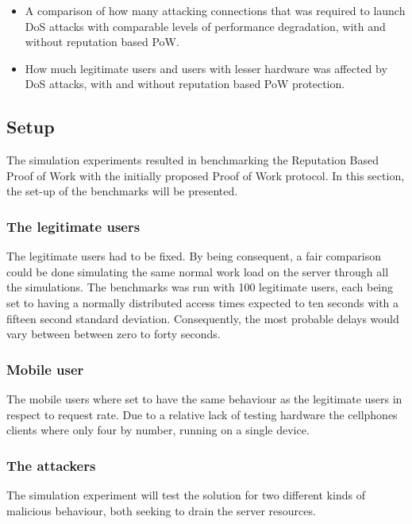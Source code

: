 \begin{itemize}
\item A comparison of how many attacking connections that was required to launch DoS attacks with comparable levels of performance degradation, with and without reputation based PoW.

\item How much legitimate users and users with lesser hardware was affected by DoS attacks, with and without reputation based PoW protection.
\end{itemize}



\subsection{Setup}
The simulation experiments resulted in benchmarking the Reputation Based Proof of Work with the initially proposed Proof of Work protocol. In this section, the set-up of the benchmarks will be presented.
\label{text:setup}
\subsubsection{The legitimate users} 
The legitimate users had to be fixed. By being consequent, a fair comparison could be done simulating the same normal work load on the server through all the simulations. The benchmarks was run with 100 legitimate users, each being set to having a normally distributed access times expected to ten seconds with a fifteen second standard deviation. Consequently, the most probable delays would vary between between zero to forty seconds.
\\
\subsubsection{Mobile user}
The mobile users where set to have the same behaviour as the legitimate users in respect to request rate. Due to a relative lack of testing hardware the cellphones clients where only four by number, running on a single device. 
\\
\subsubsection{The attackers} 
The simulation experiment will test the solution for two different kinds of malicious behaviour, both seeking to drain the server resources.

